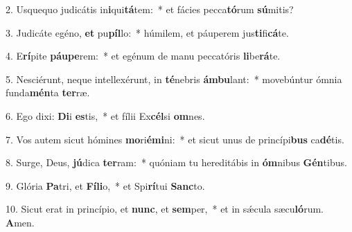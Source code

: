 2. Usquequo judicátis in\textbf{i}qui\textbf{tá}tem:~*  et fácies pecca\textbf{tó}rum \textbf{sú}mitis?\

3. Judicáte egéno, \textbf{et} pu\textbf{píl}lo:~*  húmilem, et páuperem jus\textbf{ti}fi\textbf{cá}te.\

4. E\textbf{rí}pite \textbf{páu}\textbf{pe}rem:~*  et egénum de manu peccatóris \textbf{li}be\textbf{rá}te.\

5. Nesciérunt, neque intellexérunt, in \textbf{té}nebris \textbf{ám}\textbf{bu}lant:~*  movebúntur ómnia funda\textbf{mén}ta \textbf{ter}ræ.\

6. Ego dixi: \textbf{Di}i \textbf{es}tis,~*  et fílii Ex\textbf{cél}si \textbf{om}nes.\

7. Vos autem sicut hómines \textbf{mo}ri\textbf{é}\textbf{mi}ni:~*  et sicut unus de princípi\textbf{bus} ca\textbf{dé}tis.\

8. Surge, Deus, \textbf{jú}dica \textbf{ter}ram:~*  quóniam tu hereditábis in \textbf{óm}nibus \textbf{Gén}tibus.\

9. Glória \textbf{Pa}tri, et \textbf{Fí}\textbf{li}o,~*  et Spi\textbf{rí}tui \textbf{Sanc}to.\

10. Sicut erat in princípio, et \textbf{nunc}, et \textbf{sem}per,~*  et in sǽcula sæcu\textbf{ló}rum. \textbf{A}men.\

